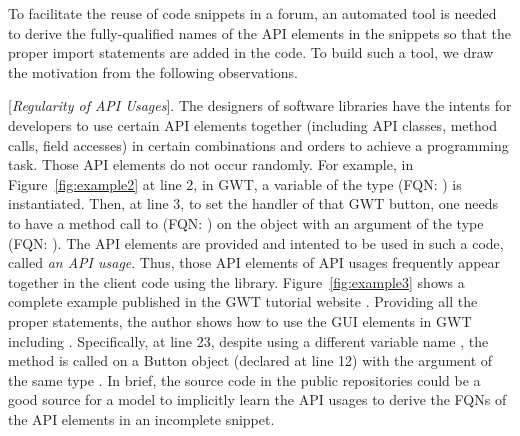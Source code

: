 To facilitate the reuse of code snippets in a forum, an automated tool
is needed to derive the fully-qualified names of the API elements in
the snippets so that the proper import statements are added in the
code. To build such a tool, we draw the motivation from the following
observations.

\vspace{2pt}
 [{\em Regularity of API Usages}]. The
designers of software libraries have the intents for developers to use
certain API elements together (including API classes, method calls,
field accesses) in certain combinations and orders to achieve a
programming task. Those API elements do not occur randomly. For
example, in Figure~\ref{fig:example2} at line 2, in GWT, a variable of
the type  (FQN:
) is instantiated. Then, at
line 3, to set the handler of that GWT button, one needs to have a
method call to  (FQN:
) on
the  object with an argument of the type
 (FQN:
).  The
API elements are provided and intented to be used in such a code,
called {\em an API usage}. Thus, those API elements of API usages
frequently appear together in the client code using the
library. Figure~\ref{fig:example3} shows a complete example published
in the GWT tutorial website . Providing all the
proper  statements, the author shows how to use the GUI
elements in GWT including . Specifically, at line 23,
despite using a different variable name , the
method  is called on a Button object (declared
at line 12) with the argument of the same type . In
brief, the source code in the public repositories could be a good
source for a model to implicitly learn the API usages to derive the
FQNs of the API elements in an incomplete snippet.



